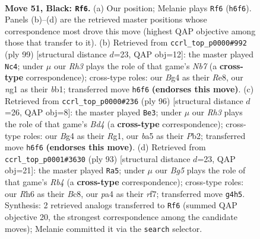 \documentclass[11pt]{article}
\begin{document}
\clearpage

\begin{figure}[p]\centering
\begin{subfigure}{0.46\textwidth}\centering
\resizebox{\linewidth}{!}{%
\newchessgame
\chessboard[
  setfen={6B1/3k4/7r/B7/P4pbp/1P6/1K6/5RN1 b - - 2 51},
  showmover=false,
  pgfstyle=straightmove, color=movearrow, markmove={h6-f6}
]}
\caption{}
\end{subfigure}\hfill
\begin{subfigure}{0.46\textwidth}\centering
\resizebox{\linewidth}{!}{%
\newchessgame
\chessboard[
  setfen={4r1k1/5p2/7B/3p4/8/6bP/1n4P1/1B3R1K b - - 1 50},
  showmover=false,
  pgfstyle=straightmove, color=movearrow, markmove={b2-c4}
]}
\caption{}
\end{subfigure}
\\[4pt]
\begin{subfigure}{0.46\textwidth}\centering
\resizebox{\linewidth}{!}{%
\newchessgame
\chessboard[
  setfen={2k5/1p3p1n/7P/p6r/3B4/8/1P6/K5R1 w - - 5 49},
  showmover=false,
  pgfstyle=straightmove, color=movearrow, markmove={d4-e3}
]}
\caption{}
\end{subfigure}\hfill
\begin{subfigure}{0.46\textwidth}\centering
\resizebox{\linewidth}{!}{%
\newchessgame
\chessboard[
  setfen={2b5/5R2/6pp/1r1k4/8/P3BP2/5P1K/8 b - - 2 47},
  showmover=false,
  pgfstyle=straightmove, color=movearrow, markmove={b5-a5}
]}
\caption{}
\end{subfigure}
\caption{\textbf{Move 51, Black: \texttt{Rf6}.} (a) Our position; Melanie plays \texttt{Rf6} (\texttt{h6f6}). Panels (b)--(d) are the retrieved master positions whose correspondence most drove this move (highest QAP objective among those that transfer to it). (b) Retrieved from \texttt{ccrl\_top\_p0000\#992} (ply 99) [structural distance $d$=23, QAP obj=12]: the master played \texttt{Nc4}; under $\mu$ our \emph{Rh3} plays the role of that game's \emph{Nb7} (a \textbf{cross-type} correspondence); cross-type roles: our \emph{B}g4 as their \emph{R}e8, our \emph{n}g1 as their \emph{b}b1; transferred move \texttt{h6f6} \textbf{(endorses this move)}. (c) Retrieved from \texttt{ccrl\_top\_p0000\#236} (ply 96) [structural distance $d$=26, QAP obj=8]: the master played \texttt{Be3}; under $\mu$ our \emph{Rh3} plays the role of that game's \emph{Bd4} (a \textbf{cross-type} correspondence); cross-type roles: our \emph{B}g4 as their \emph{R}g1, our \emph{b}a5 as their \emph{P}b2; transferred move \texttt{h6f6} \textbf{(endorses this move)}. (d) Retrieved from \texttt{ccrl\_top\_p0001\#3630} (ply 93) [structural distance $d$=23, QAP obj=21]: the master played \texttt{Ra5}; under $\mu$ our \emph{Bg5} plays the role of that game's \emph{Rb4} (a \textbf{cross-type} correspondence); cross-type roles: our \emph{R}h6 as their \emph{B}c8, our \emph{p}a4 as their \emph{r}f7; transferred move \texttt{g4h5}. Synthesis: 2 retrieved analogs transferred to \texttt{Rf6} (summed QAP objective 20, the strongest correspondence among the candidate moves); Melanie committed it via the \texttt{search} selector.}
\label{fig:thought-m101}
\end{figure}
\end{document}
